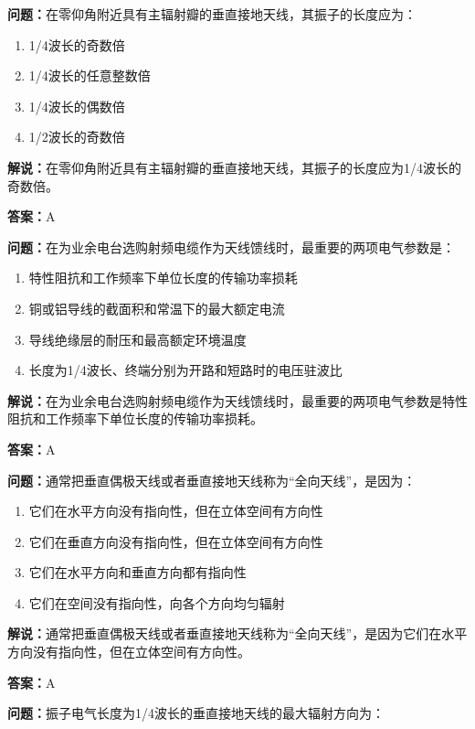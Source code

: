 \textbf{问题：}在零仰角附近具有主辐射瓣的垂直接地天线，其振子的长度应为：

\begin{enumerate}[label=\Alph*), leftmargin=3em]
	\item 1/4波长的奇数倍
	\item 1/4波长的任意整数倍
	\item 1/4波长的偶数倍
	\item 1/2波长的奇数倍
\end{enumerate}

\textbf{解说：}在零仰角附近具有主辐射瓣的垂直接地天线，其振子的长度应为1/4波长的奇数倍。%

\textbf{答案：}A

\textbf{问题：}在为业余电台选购射频电缆作为天线馈线时，最重要的两项电气参数是：

\begin{enumerate}[label=\Alph*), leftmargin=3em]
	\item 特性阻抗和工作频率下单位长度的传输功率损耗
	\item 铜或铝导线的截面积和常温下的最大额定电流
	\item 导线绝缘层的耐压和最高额定环境温度
	\item 长度为1/4波长、终端分别为开路和短路时的电压驻波比
\end{enumerate}

\textbf{解说：}在为业余电台选购射频电缆作为天线馈线时，最重要的两项电气参数是特性阻抗和工作频率下单位长度的传输功率损耗。%

\textbf{答案：}A

\textbf{问题：}通常把垂直偶极天线或者垂直接地天线称为“全向天线”，是因为：

\begin{enumerate}[label=\Alph*), leftmargin=3em]
	\item 它们在水平方向没有指向性，但在立体空间有方向性
	\item 它们在垂直方向没有指向性，但在立体空间有方向性
	\item 它们在水平方向和垂直方向都有指向性
	\item 它们在空间没有指向性，向各个方向均匀辐射
\end{enumerate}

\textbf{解说：}通常把垂直偶极天线或者垂直接地天线称为“全向天线”，是因为它们在水平方向没有指向性，但在立体空间有方向性。%

\textbf{答案：}A

\textbf{问题：}振子电气长度为1/4波长的垂直接地天线的最大辐射方向为：

